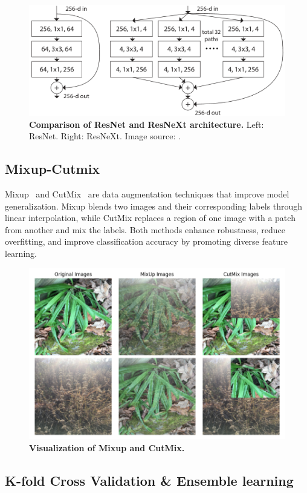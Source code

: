 \documentclass[10pt,twocolumn,letterpaper]{article}
\begin{document}
\begin{figure}[h]
  \centering
  \includegraphics[width=0.8\linewidth]{assets/resnext_arch.png}
  \caption{\textbf{Comparison of ResNet and ResNeXt architecture.}
    Left: ResNet. Right: ResNeXt. Image source: \cite{Xie2016}.}
  \label{fig:resnext}
\end{figure}

\subsection{Mixup-Cutmix}

Mixup~\cite{zhang2018mixup} and CutMix~\cite{yun2019cutmix} are data
augmentation techniques that improve model generalization. Mixup blends
two images and their corresponding labels through linear interpolation,
while CutMix replaces
a region of one image with a patch from another and mix the labels. Both
methods enhance robustness, reduce overfitting, and improve classification
accuracy by promoting diverse feature learning.

\begin{figure}[h]
  \centering
  \includegraphics[width=0.8\linewidth]{assets/mixup_cutmix.png}
  \caption{\textbf{Visualization of Mixup and CutMix.}}
  \label{fig:mixup-cutmix}
\end{figure}

\subsection{K-fold Cross Validation \& Ensemble learning}
\end{document}
